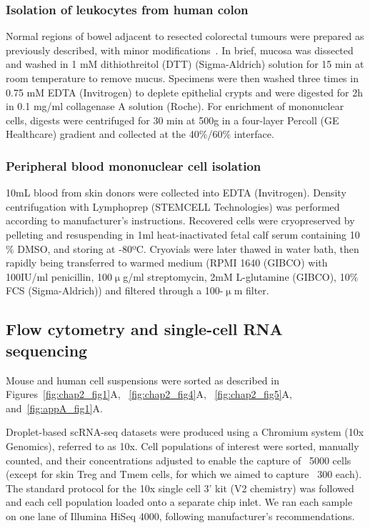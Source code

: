 \subsubsection{Isolation of leukocytes from human colon}
Normal regions of bowel adjacent to resected colorectal tumours were prepared as previously described, with minor modifications~\citep{Bettelli2006-dw,Geremia2011-gr}. In brief, mucosa was dissected and washed in 1 mM dithiothreitol (DTT) (Sigma-Aldrich) solution for 15 min at room temperature to remove mucus. Specimens were then washed three times in 0.75 mM EDTA (Invitrogen) to deplete epithelial crypts and were digested for 2h in 0.1 mg/ml collagenase A solution (Roche). For enrichment of mononuclear cells, digests were centrifuged for 30 min at 500g in a four-layer Percoll (GE Healthcare) gradient and collected at the 40${\%}$/60${\%}$ interface.

\subsubsection{Peripheral blood mononuclear cell isolation}
10mL blood from skin donors were collected into EDTA (Invitrogen). Density centrifugation with Lymphoprep (STEMCELL Technologies) was performed according to manufacturer’s instructions. Recovered cells were cryopreserved by pelleting and resuspending in 1ml heat-inactivated fetal calf serum containing 10${\%}$ DMSO, and storing at -80ºC. Cryovials were later thawed in water bath, then rapidly being transferred to warmed medium (RPMI 1640 (GIBCO) with 100IU/ml penicillin, 100${\upmu}$g/ml streptomycin, 2mM L-glutamine (GIBCO), 10${\%}$ FCS (Sigma-Aldrich)) and filtered through a 100-${\upmu}$m filter.

\subsection{Flow cytometry and single-cell RNA sequencing}
Mouse and human cell suspensions were sorted as described in Figures~\ref{fig:chap2_fig1}A, ~\ref{fig:chap2_fig4}A, ~\ref{fig:chap2_fig5}A, and~\ref{fig:appA_fig1}A.

Droplet-based scRNA-seq datasets were produced using a Chromium system (10x Genomics), referred to as 10x. Cell populations of interest were sorted, manually counted, and their concentrations adjusted to enable the capture of ~5000 cells (except for skin Treg and Tmem cells, for which we aimed to capture ~300 each). The standard protocol for the 10x single cell 3’ kit (V2 chemistry) was followed and each cell population loaded onto a separate chip inlet. We ran each sample on one lane of Illumina HiSeq 4000, following manufacturer’s recommendations.

